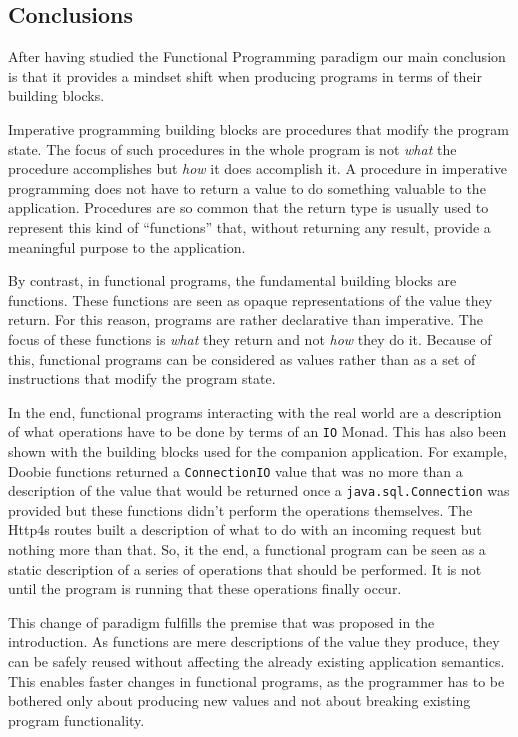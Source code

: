\documentclass[../main.tex]{subfiles}
\begin{document}
\subsection{Conclusions}
After having studied the Functional Programming paradigm our main conclusion is
that it provides a mindset shift when producing programs in terms of their
building blocks.

Imperative programming building blocks are procedures that modify the program
state. The focus of such procedures in the whole program is not \textit{what} the
procedure accomplishes but \textit{how} it does accomplish it. A procedure in
imperative programming does not have to return a value to do something valuable
to the application. Procedures are so common that the  return type is usually used to
represent this kind of ``functions'' that, without returning any result, provide a
meaningful purpose to the application.

By contrast, in functional programs, the fundamental building blocks are functions. These
functions are seen as opaque representations of the value they return. For this
reason, programs are rather declarative than imperative. The focus of these
functions is \textit{what} they return and not \textit{how} they do it. Because of this,
functional programs can be considered as values rather than as a set of
instructions that modify the program state.

In the end, functional programs interacting with the real world are a description of what operations have to
be done by terms of an \texttt{IO} Monad. This has also been shown with the
building blocks used for the companion application. For example, Doobie functions
returned a \texttt{ConnectionIO} value that was no more than a description of
the value that would be returned once a \texttt{java.sql.Connection} was
provided but these functions didn't perform the operations themselves. The Http4s routes built a
description of what to do with an incoming request but nothing more than that. So,
it the end, a functional program can be seen as a static description of a series of
operations that should be performed. It is not until the program is running that these
operations finally occur.

This change of paradigm fulfills the premise that was proposed in the introduction. As
functions are mere descriptions of the value they produce, they can be safely
reused without affecting the already existing application semantics. This enables
faster changes in functional programs, as the programmer has to be bothered
only about producing new values and not about breaking existing program
functionality.
\end{document}
